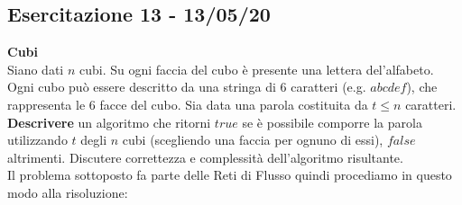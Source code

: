 \documentclass[../cheatSheetAlgoritmi.tex]{subfiles}
\begin{document}
\subsection{Esercitazione 13 - 13/05/20}
\textbf{Cubi}\\
Siano dati $n$ cubi. Su ogni faccia del cubo è presente una lettera del'alfabeto. Ogni cubo può essere descritto da una stringa di $6$ caratteri (e.g. $abcdef$), che rappresenta le 6 facce del cubo. Sia data una parola costituita da $t \leq n$ caratteri. \textbf{Descrivere} un algoritmo che ritorni $true$ se è possibile comporre la parola utilizzando $t$ degli $n$ cubi (scegliendo una faccia per ognuno di essi), $false$ altrimenti. Discutere correttezza e complessità dell’algoritmo risultante.\\
Il problema sottoposto fa parte delle Reti di Flusso quindi procediamo in questo modo alla risoluzione:
\end{document}
